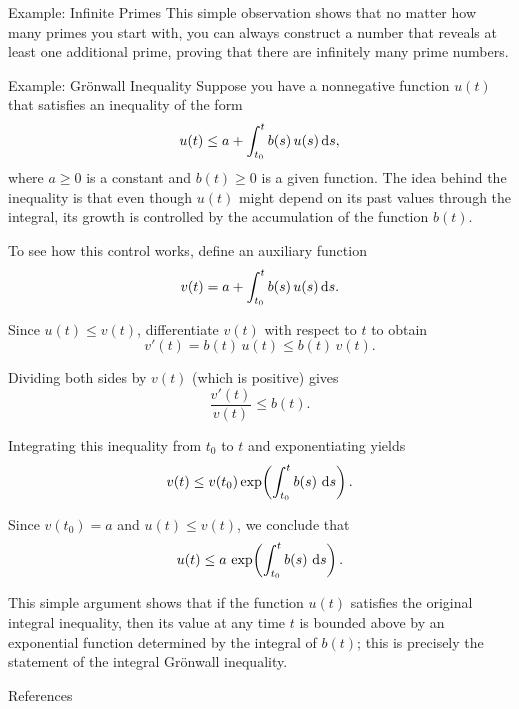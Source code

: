 \documentclass[final]{beamer}
\begin{document}
\begin{frame}[fragile]
\begin{columns}[t]
\begin{column}{0.3\paperwidth}
\begin{exampleblock}{Example: Infinite Primes}
    This simple observation shows that no matter how many primes you start with,
    you can always construct a number that reveals at least one additional prime,
    proving that there are infinitely many prime numbers.
\end{exampleblock}

\begin{exampleblock}{Example: Grönwall Inequality}
    Suppose you have a nonnegative function \(u(t)\) that satisfies an inequality
    of the form
    \[
        u(t) \le a + \int_{t_0}^t b(s)\, u(s) \dx[s],
    \]
    where \(a \ge 0\) is a constant and \(b(t) \ge 0\) is a given function. The
    idea behind the inequality is that even though \(u(t)\) might depend on its
    past values through the integral, its growth is controlled by the accumulation
    of the function \(b(t)\).

    \bigskip
    To see how this control works, define an auxiliary function
    \[
        v(t) = a + \int_{t_0}^t b(s)\, u(s) \dx[s].
    \]

    Since \(u(t) \le v(t)\), differentiate \(v(t)\) with respect to \(t\) to obtain
    \[
        v'(t) = b(t)\, u(t) \le b(t)\, v(t).
    \]

    Dividing both sides by \(v(t)\) (which is positive) gives
    \[
        \frac{v'(t)}{v(t)} \le b(t).
    \]

    Integrating this inequality from \(t_0\) to \(t\) and exponentiating yields
    \[
        v(t) \le v(t_0) \exp\!\left(\int_{t_0}^t b(s)\, \dx[s]\right).
    \]

    Since \(v(t_0)=a\) and \(u(t) \le v(t)\), we conclude that
    \[
        u(t) \le a\, \exp\!\left(\int_{t_0}^t b(s)\, \dx[s]\right).
    \]

    \bigskip

    This simple argument shows that if the function \(u(t)\) satisfies the original
    integral inequality, then its value at any time \(t\) is bounded above by an
    exponential function determined by the integral of \(b(t)\); this is precisely
    the statement of the integral Grönwall inequality.
\end{exampleblock}

\begin{alertblock}{References}
    \nocite{*}
    
    
\end{alertblock}

\end{column}
\separatorcolumn
\end{columns}
\end{frame}
\end{document}
